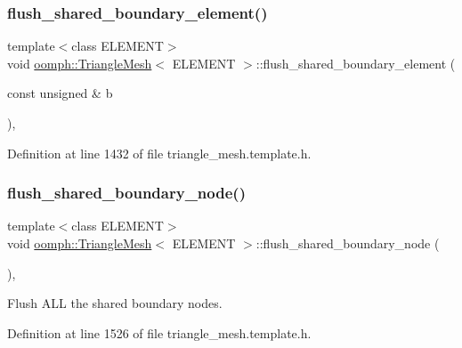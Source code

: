 \subsubsection{\texorpdfstring{flush\+\_\+shared\+\_\+boundary\+\_\+element()}{flush\_shared\_boundary\_element()}\hspace{0.1cm}{\footnotesize\ttfamily [2/2]}}
{\footnotesize\ttfamily template$<$class E\+L\+E\+M\+E\+NT$>$ \\
void \hyperlink{classoomph_1_1TriangleMesh}{oomph\+::\+Triangle\+Mesh}$<$ E\+L\+E\+M\+E\+NT $>$\+::flush\+\_\+shared\+\_\+boundary\+\_\+element (\begin{DoxyParamCaption}\item[{const unsigned \&}]{b }\end{DoxyParamCaption})\hspace{0.3cm}{\ttfamily [inline]}, {\ttfamily [protected]}}



Definition at line 1432 of file triangle\+\_\+mesh.\+template.\+h.

\mbox{\label{classoomph_1_1TriangleMesh_addbb476c72cce6f9d190d6bc026edbf0}} 
\subsubsection{\texorpdfstring{flush\+\_\+shared\+\_\+boundary\+\_\+node()}{flush\_shared\_boundary\_node()}\hspace{0.1cm}{\footnotesize\ttfamily [1/2]}}
{\footnotesize\ttfamily template$<$class E\+L\+E\+M\+E\+NT$>$ \\
void \hyperlink{classoomph_1_1TriangleMesh}{oomph\+::\+Triangle\+Mesh}$<$ E\+L\+E\+M\+E\+NT $>$\+::flush\+\_\+shared\+\_\+boundary\+\_\+node (\begin{DoxyParamCaption}{ }\end{DoxyParamCaption})\hspace{0.3cm}{\ttfamily [inline]}, {\ttfamily [protected]}}



Flush A\+LL the shared boundary nodes. 



Definition at line 1526 of file triangle\+\_\+mesh.\+template.\+h.

